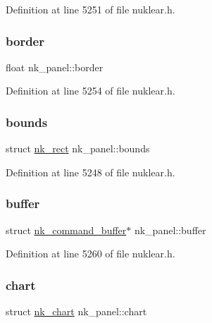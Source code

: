 Definition at line 5251 of file nuklear.\+h.

\mbox{\label{structnk__panel_a18d808e6efd65f6ae8b6c35ac8e12541}} 
\subsubsection{\texorpdfstring{border}{border}}
{\footnotesize\ttfamily float nk\+\_\+panel\+::border}



Definition at line 5254 of file nuklear.\+h.

\mbox{\label{structnk__panel_ac959321fd621009edb4b5cc9ad8f1b17}} 
\subsubsection{\texorpdfstring{bounds}{bounds}}
{\footnotesize\ttfamily struct \mbox{\hyperlink{structnk__rect}{nk\+\_\+rect}} nk\+\_\+panel\+::bounds}



Definition at line 5248 of file nuklear.\+h.

\mbox{\label{structnk__panel_af92431d2360f7f815e7caf2896ea9090}} 
\subsubsection{\texorpdfstring{buffer}{buffer}}
{\footnotesize\ttfamily struct \mbox{\hyperlink{structnk__command__buffer}{nk\+\_\+command\+\_\+buffer}}$\ast$ nk\+\_\+panel\+::buffer}



Definition at line 5260 of file nuklear.\+h.

\mbox{\label{structnk__panel_a435683be8b2ee51cf51eb8254bccbb87}} 
\subsubsection{\texorpdfstring{chart}{chart}}
{\footnotesize\ttfamily struct \mbox{\hyperlink{structnk__chart}{nk\+\_\+chart}} nk\+\_\+panel\+::chart}



